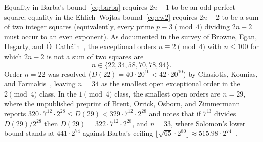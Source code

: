 \documentclass[11pt]{article}
\theoremstyle{remark}
\begin{document}
Equality in Barba's bound~\eqref{eq:barba} requires $2n - 1$ to be an odd perfect square; equality in the Ehlich--Wojtas bound~\eqref{eq:ew2} requires $2n - 2$ to be a sum of two integer squares (equivalently, every prime $p \equiv 3 \pmod 4$ dividing $2n - 2$ must occur to an even exponent). As documented in the survey of Browne, Egan, Hegarty, and \'O~Cath\'ain~\cite{browne2021survey}, the exceptional orders $n \equiv 2 \pmod 4$ with $n \le 100$ for which $2n - 2$ is not a sum of two squares are
\[
  n \in \{22, 34, 58, 70, 78, 94\}.
\]
Order $n = 22$ was resolved ($D(22) = 40 \cdot 20^{10} < 42 \cdot 20^{10}$) by Chasiotis, Kounias, and Farmakis~\cite{chasiotis2018,chasiotis2019corr}, leaving $n = 34$ as the smallest open exceptional order in the $2 \pmod 4$ class. In the $1 \pmod 4$ class, the smallest open orders are $n = 29$, where the unpublished preprint of Brent, Orrick, Osborn, and Zimmermann~\cite{brent2012maximal} reports $320 \cdot 7^{12} \cdot 2^{28} \le D(29) < 329 \cdot 7^{12} \cdot 2^{28}$ and notes that if $7^{13}$ divides $D(29)/2^{28}$ then $D(29) = 322 \cdot 7^{12} \cdot 2^{28}$, and $n = 33$, where Solomon's lower bound stands at $441 \cdot 2^{74}$ against Barba's ceiling $\lfloor\sqrt{65}\cdot 2^{80}\rfloor \approx 515.98 \cdot 2^{74}$~\cite{orrick2003,orrick2007,brent2012maxdet}.
\end{document}
